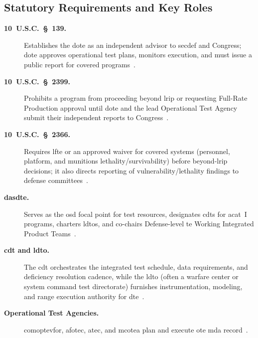 \documentclass[../main.tex]{subfiles}
\begin{document}
\subsection{Statutory Requirements and Key Roles}
\begin{description}
  \item[\textbf{10~U.S.C.~\S~139.}] Establishes the \ac{dote} as an independent advisor to \ac{secdef} and Congress; \ac{dote} approves operational test plans, monitors execution, and must issue a public report for covered programs~\autocite{USC-10-139}.
  \item[\textbf{10~U.S.C.~\S~2399.}] Prohibits a program from proceeding beyond \ac{lrip} or requesting Full-Rate Production approval until \ac{dote} and the lead Operational Test Agency submit their independent reports to Congress~\autocite{USC-10-2399}.
  \item[\textbf{10~U.S.C.~\S~2366.}] Requires \ac{lfte} or an approved waiver for covered systems (personnel, platform, and munitions lethality/survivability) before beyond-\ac{lrip} decisions; it also directs reporting of vulnerability/lethality findings to defense committees~\autocite{USC-10-2366}.
  \item[\textbf{\ac{dasdte}.}] Serves as the \ac{osd} focal point for test resources, designates \acp{cdt} for \ac{acat}~I programs, charters \acp{ldto}, and co-chairs Defense-level \ac{te} Working Integrated Product Teams~\autocite{DoDI5000-89}.
  \item[\textbf{\ac{cdt} and \ac{ldto}.}] The \ac{cdt} orchestrates the integrated test schedule, data requirements, and deficiency resolution cadence, while the \ac{ldto} (often a warfare center or system command test directorate) furnishes instrumentation, modeling, and range execution authority for \ac{dte}~\autocite{DoDI5000-89}.
  \item[\textbf{Operational Test Agencies.}] \ac{comoptevfor}, \ac{afotec}, \ac{atec}, and \ac{mcotea} plan and execute \ac{ote} \ac{mda} record~\autocite{edo-3-5-6-test-eval-part-ii-2025}.
\end{description}
\end{document}
